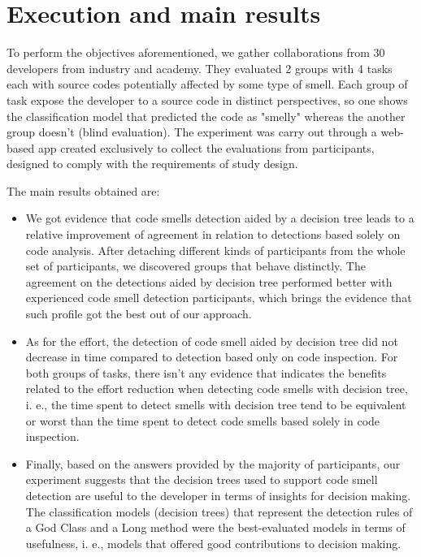 \section{Execution and main results}

To perform  the objectives aforementioned,  we gather collaborations from 30  developers from industry and academy. They evaluated 2 groups with 4 tasks each with source codes potentially affected by some type of smell. Each group of task expose the developer to a source code in distinct perspectives, so one shows the classification model that predicted the code as "smelly" whereas the another group doesn't (blind evaluation).  The experiment was carry out through a web-based app created exclusively to collect the evaluations from participants, designed to comply with the requirements of study design.

The main results obtained are:

\begin{itemize}
    \item We got evidence that code smells detection aided by a decision tree leads to a  relative improvement of agreement in relation to detections based solely on code analysis. After detaching different kinds of participants from the whole set of participants, we discovered groups that behave distinctly. The agreement on the detections aided by decision tree performed better with experienced code smell detection participants, which brings the evidence that such profile got the best out of our approach.

    \item As for the effort, the detection of code smell aided by decision tree did not decrease in time compared to detection based only on code inspection. For both groups of tasks, there isn’t any evidence that indicates the benefits related to the effort reduction when detecting code smells with decision tree, i. e., the time spent to detect smells with decision tree tend to be equivalent or worst than the time spent to detect code smells based solely in code inspection. 
    
    \item Finally, based on the answers provided by the majority of participants, our experiment suggests that the decision trees used to support code smell detection are useful to the developer in terms of insights for decision making. The classification models (decision trees) that represent the detection rules of a God Class and a Long method were the best-evaluated models in terms of usefulness, i. e., models that offered good contributions to decision making.
\end{itemize}



